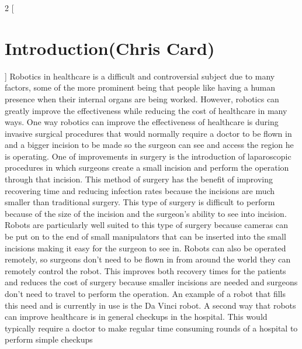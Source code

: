 \documentclass{article}
\begin{document}
\begin{multicols*}{2}
[
\section{Introduction(Chris Card)}
]
Robotics in healthcare is a difficult and controversial subject due to many factors, some of the more prominent being that people like having a human presence when their internal organs are being worked.  However, robotics can greatly improve the effectiveness while reducing the cost of healthcare in many ways.
\newline
One way robotics can improve the effectiveness of healthcare is during invasive surgical procedures that would normally require a doctor to be flown in and a bigger incision to be made so the surgeon can see and access the region he is operating.  One of improvements in surgery is the introduction of laparoscopic procedures in which surgeons create a small incision and perform the operation through that incision.  This method of surgery has the benefit of improving recovering time and reducing infection rates because the incisions are much smaller than traditional surgery.  This type of surgery is difficult to perform because of the size of the incision and the surgeon’s ability to see into incision.  Robots are particularly well suited to this type of surgery because cameras can be put on to the end of small manipulators that can be inserted into the small incisions making it easy for the surgeon to see in.  Robots can also be operated remotely, so surgeons don’t need to be flown in from around the world they can remotely control the robot.  This improves both recovery times for the patients and reduces the cost of surgery because smaller incisions are needed and surgeons don’t need to travel to perform the operation.  An example of a robot that fills this need and is currently in use is the Da Vinci robot.
\newline
A second way that robots can improve healthcare is in general checkups in the hospital.  This would typically require a doctor to make regular time consuming rounds of a hospital to perform simple checkups
\end{multicols*}
\end{document}

